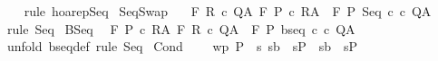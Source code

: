 \begin{isabellebody}
%
\isadelimproof
\ \ %
\endisadelimproof
%
\isatagproof
{}\isamarkupfalse%
\ {\isacharparenleft}rule\ hoarep{\isachardot}Seq{\isacharparenright}%
\endisatagproof
{\isafoldproof}%
%
\isadelimproof
\isanewline
%
\endisadelimproof
\isanewline
{}\isamarkupfalse%
\ SeqSwap{\isacharcolon}\ \isanewline
\ \ {\isachardoublequoteopen}{\isasymlbrakk}{\isasymGamma}{\isacharcomma}{\isasymTheta}{\isasymturnstile}\isactrlbsub {\isacharslash}F\isactrlesub \ R\ c{}\ Q{\isacharcomma}A{\isacharsemicolon}\ {\isasymGamma}{\isacharcomma}{\isasymTheta}{\isasymturnstile}\isactrlbsub {\isacharslash}F\isactrlesub \ P\ c{}\ R{\isacharcomma}A{\isasymrbrakk}\ {\isasymLongrightarrow}\ {\isasymGamma}{\isacharcomma}{\isasymTheta}{\isasymturnstile}\isactrlbsub {\isacharslash}F\isactrlesub \ P\ {\isacharparenleft}Seq\ c{}\ c{}{\isacharparenright}\ Q{\isacharcomma}A{\isachardoublequoteclose}\isanewline
%
\isadelimproof
\ \ %
\endisadelimproof
%
\isatagproof
{}\isamarkupfalse%
\ {\isacharparenleft}rule\ Seq{\isacharparenright}%
\endisatagproof
{\isafoldproof}%
%
\isadelimproof
\isanewline
%
\endisadelimproof
\isanewline
{}\isamarkupfalse%
\ BSeq{\isacharcolon}\isanewline
\ \ {\isachardoublequoteopen}{\isasymlbrakk}{\isasymGamma}{\isacharcomma}{\isasymTheta}{\isasymturnstile}\isactrlbsub {\isacharslash}F\isactrlesub \ P\ c\ R{\isacharcomma}A{\isacharsemicolon}\ {\isasymGamma}{\isacharcomma}{\isasymTheta}{\isasymturnstile}\isactrlbsub {\isacharslash}F\isactrlesub \ R\ c\ Q{\isacharcomma}A{\isasymrbrakk}\ {\isasymLongrightarrow}\ {\isasymGamma}{\isacharcomma}{\isasymTheta}{\isasymturnstile}\isactrlbsub {\isacharslash}F\isactrlesub \ P\ {\isacharparenleft}bseq\ c\ c\ Q{\isacharcomma}A{\isachardoublequoteclose}\isanewline
%
\isadelimproof
\ \ %
\endisadelimproof
%
\isatagproof
{}\isamarkupfalse%
\ {\isacharparenleft}unfold\ bseq{\isacharunderscore}def{\isacharparenright}\ {\isacharparenleft}rule\ Seq{\isacharparenright}%
\endisatagproof
{\isafoldproof}%
%
\isadelimproof
\isanewline
%
\endisadelimproof
\isanewline
\isanewline
{}\isamarkupfalse%
\ Cond{\isacharcolon}\ \isanewline
\ \ \ wp{\isacharcolon}\ {\isachardoublequoteopen}P\ {\isasymsubseteq}\ {\isacharbraceleft}s{\isachardot}\ {\isacharparenleft}s{\isasymin}b\ {\isasymlongrightarrow}\ s{\isasymin}P\ {\isasymand}\ {\isacharparenleft}s{\isasymnotin}b\ {\isasymlongrightarrow}\ s{\isasymin}P\ \isanewline

\end{isabellebody}

